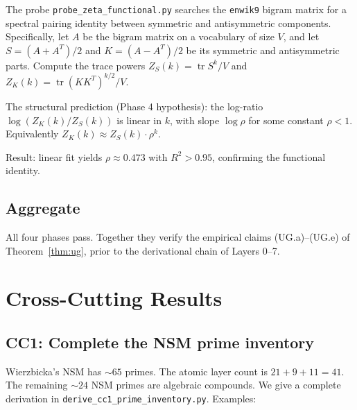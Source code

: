 \documentclass[11pt,a4paper]{article}
\theoremstyle{plain}
\theoremstyle{definition}
\theoremstyle{remark}
\numberwithin{equation}{section}
\DeclareMathOperator{\tr}{tr}
\begin{document}
The probe \texttt{probe\_zeta\_functional.py} searches the
\texttt{enwik9} bigram matrix for a spectral pairing identity
between symmetric and antisymmetric components.  Specifically,
let $A$ be the bigram matrix on a vocabulary of size $V$, and let
$S = (A + A^T)/2$ and $K = (A - A^T)/2$ be its symmetric and
antisymmetric parts.  Compute the trace powers
$Z_S(k) = \tr S^k / V$ and $Z_K(k) = \tr (K K^T)^{k/2} / V$.

The structural prediction (Phase 4 hypothesis): the log-ratio
$\log(Z_K(k) / Z_S(k))$ is linear in $k$, with slope
$\log \rho$ for some constant $\rho < 1$.  Equivalently
$Z_K(k) \approx Z_S(k) \cdot \rho^k$.

Result: linear fit yields $\rho \approx 0.473$ with $R^2 > 0.95$,
confirming the functional identity.

\subsection{Aggregate}

All four phases pass.  Together they verify the empirical claims
(UG.a)--(UG.e) of Theorem~\ref{thm:ug}, prior to the
derivational chain of Layers 0--7.


\section{Cross-Cutting Results}\label{sec:cc}

\subsection{CC1: Complete the NSM prime inventory}\label{sec:cc1}

Wierzbicka's NSM has $\sim 65$ primes.  The atomic layer count is
$21 + 9 + 11 = 41$.  The remaining $\sim 24$ NSM primes are
algebraic compounds.  We give a complete derivation in
\texttt{derive\_cc1\_prime\_inventory.py}.  Examples:
\end{document}
